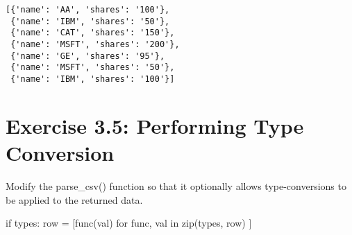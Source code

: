 \documentclass[
  letterpaper,
  DIV=11,
  numbers=noendperiod]{scrreprt}
\newenvironment{Shaded}{\begin{snugshade}}{\end{snugshade}}
\newcommand{\BuiltInTok}[1]{\textcolor[rgb]{0.00,0.46,0.62}{#1}}
\newcommand{\ControlFlowTok}[1]{\textcolor[rgb]{0.00,0.46,0.62}{#1}}
\newcommand{\KeywordTok}[1]{\textcolor[rgb]{0.00,0.46,0.62}{#1}}
\newcommand{\NormalTok}[1]{\textcolor[rgb]{0.00,0.46,0.62}{#1}}
\newcommand{\OperatorTok}[1]{\textcolor[rgb]{0.37,0.37,0.37}{#1}}
\begin{document}
\begin{verbatim}
[{'name': 'AA', 'shares': '100'},
 {'name': 'IBM', 'shares': '50'},
 {'name': 'CAT', 'shares': '150'},
 {'name': 'MSFT', 'shares': '200'},
 {'name': 'GE', 'shares': '95'},
 {'name': 'MSFT', 'shares': '50'},
 {'name': 'IBM', 'shares': '100'}]
\end{verbatim}

\hypertarget{exercise-3.5-performing-type-conversion}{%
\section{Exercise 3.5: Performing Type
Conversion}\label{exercise-3.5-performing-type-conversion}}

Modify the parse\_csv() function so that it optionally allows
type-conversions to be applied to the returned data.

\begin{Shaded}
\begin{Highlighting}[]
\ControlFlowTok{if}\NormalTok{ types:}
\NormalTok{    row }\OperatorTok{=}\NormalTok{ [func(val) }\ControlFlowTok{for}\NormalTok{ func, val }\KeywordTok{in} \BuiltInTok{zip}\NormalTok{(types, row) ]}
\end{Highlighting}
\end{Shaded}
\end{document}
